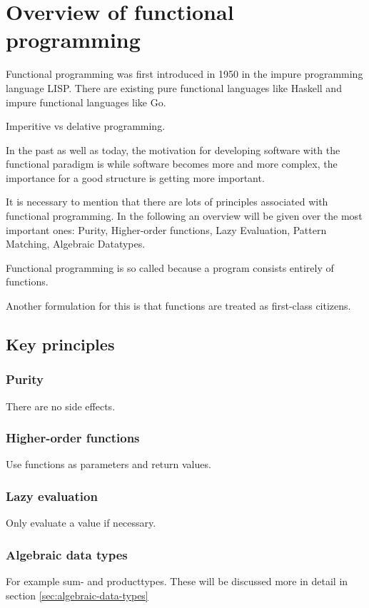 \chapter{Overview of functional programming}\label{chap:functional-programming}
Functional programming was first introduced in 1950 in the impure programming language LISP. There are existing pure functional languages like Haskell and impure functional languages like Go.

Imperitive vs delative programming.

In the past as well as today, the motivation for developing software with the functional paradigm is while software becomes more and more complex, the importance for a good structure is getting more important.\cite{Hughes1989}

It is necessary to mention that there are lots of principles associated with functional programming. In the following an overview will be given over the most important ones: Purity, Higher-order functions, Lazy Evaluation, Pattern Matching, Algebraic Datatypes.

\begin{shaded}
    \noindent
    \glqq{}Functional programming is so called because a program consists entirely of functions.\grqq{} \cite{Hughes1989}
\end{shaded}
Another formulation for this is that functions are treated as first-class citizens.

    \section{Key principles}
        \subsection{Purity}
        There are no side effects.

        \subsection{Higher-order functions}
        Use functions as parameters and return values.

        \subsection{Lazy evaluation}
        Only evaluate a value if necessary.

        \subsection{Algebraic data types}
        For example sum- and producttypes. These will be discussed more in detail in section \ref{sec:algebraic-data-types}

